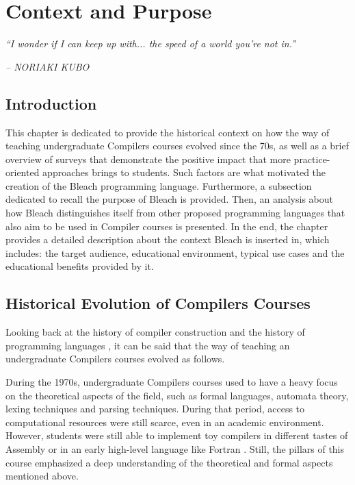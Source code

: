 \chapter{Context and Purpose} \label{cap:metodologia}

\begin{displayquote}
    \begin{center}
        \textit{``I wonder if I can keep up with... the speed of a world you're not in.''}
    \end{center}
\end{displayquote}

\begin{flushright}
   \textit{-- NORIAKI KUBO}
\end{flushright}

\section{Introduction}
This chapter is dedicated to provide the historical context on how the way of teaching undergraduate Compilers courses evolved since the 70s, as well as a brief overview of surveys that demonstrate the positive impact that more practice-oriented approaches brings to students. Such factors are what motivated the creation of the Bleach programming language. Furthermore, a subsection dedicated to recall the purpose of Bleach is provided. Then, an analysis about how Bleach distinguishes itself from other proposed programming languages that also aim to be used in Compiler courses is presented. In the end, the chapter provides a detailed description about the context Bleach is inserted in, which includes: the target audience, educational environment, typical use cases and the educational benefits provided by it.

\section{Historical Evolution of Compilers Courses}
Looking back at the history of compiler construction \cite{wikipedia_compiler_construction} and the history of programming languages \cite{wikipedia_programming_languages}, it can be said that the way of teaching an undergraduate Compilers courses evolved as follows.

During the 1970s, undergraduate Compilers courses used to have a heavy focus on the theoretical aspects of the field, such as formal languages, automata theory, lexing techniques and parsing techniques. During that period, access to computational resources were still scarce, even in an academic environment. However, students were still able to implement toy compilers in different tastes of Assembly or in an early high-level language like Fortran \cite{fortran_official_website}. Still, the pillars of this course emphasized a deep understanding of the theoretical and formal aspects mentioned above.


